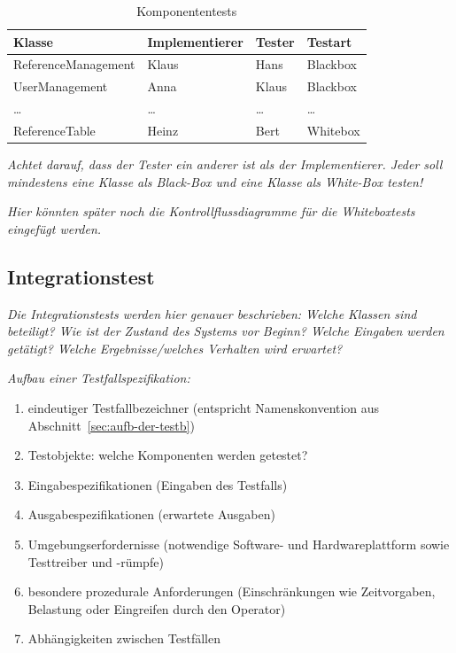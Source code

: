 \documentclass[fontsize=12pt,paper=a4,twoside]{scrartcl}
\begin{document}
\begin{table}[h]
\centering
\begin{tabular}{|l|p{3cm}|p{3cm}|l|}
\hline
Klasse & Implementierer & Tester & Testart \\
\hline
ReferenceManagement & Klaus  & Hans    & Blackbox \\
UserManagement      & Anna   & Klaus   & Blackbox \\
\dots               & \dots  & \dots   & \dots \\
ReferenceTable      & Heinz  & Bert    & Whitebox \\
\hline
\end{tabular}
\caption{Komponententests}
\label{tab:komponententests}
\end{table}

{\em Achtet darauf, dass der Tester ein anderer ist als der
  Implementierer. Jeder soll mindestens eine Klasse als Black-Box und
  eine Klasse als White-Box testen!}

{\em Hier könnten später noch die Kontrollflussdiagramme für die
  Whiteboxtests eingefügt werden.}

\clearpage
\subsection{Integrationstest}\label{c10a}

{\em Die Integrationstests werden hier genauer beschrieben: Welche
  Klassen sind beteiligt? Wie ist der Zustand des Systems vor Beginn?
  Welche Eingaben werden getätigt? Welche Ergebnisse/welches Verhalten
  wird erwartet?}

{\em Aufbau einer Testfallspezifikation:
\begin{enumerate}
\item eindeutiger Testfallbezeichner (entspricht Namenskonvention aus Abschnitt~\ref{sec:aufb-der-testb})
\item Testobjekte: welche Komponenten werden getestet?
\item Eingabespezifikationen (Eingaben des Testfalls)
\item Ausgabespezifikationen (erwartete Ausgaben)
\item Umgebungserfordernisse (notwendige Software- und
  Hardwareplattform sowie Testtreiber und -rümpfe)
\item besondere prozedurale Anforderungen (Einschränkungen wie
  Zeitvorgaben, Belastung oder Eingreifen durch den Operator)
\item Abhängigkeiten zwischen Testfällen
\end{enumerate}
}
\end{document}
